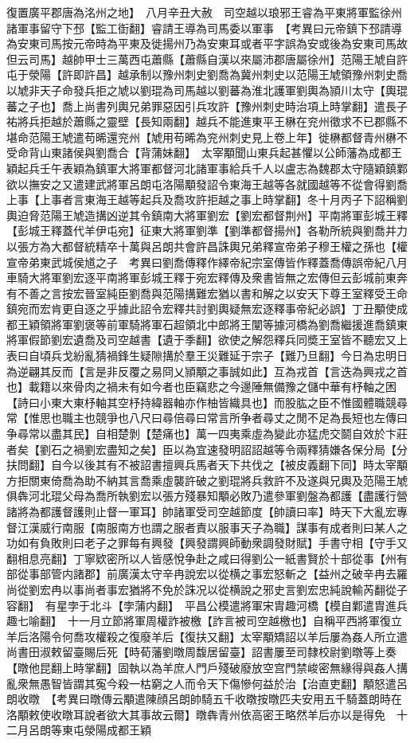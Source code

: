 復置廣平郡唐為洺州之地】　八月辛丑大赦　司空越以琅邪王睿為平東將軍監徐州諸軍事留守下邳【監工衘翻】睿請王導為司馬委以軍事　【考異曰元帝鎮下邳請導為安東司馬按元帝時為平東及徙揚州乃為安東耳或者平字誤為安或後為安東司馬故但云司馬】越帥甲士三萬西屯蕭縣【蕭縣自漢以來屬沛郡唐屬徐州】范陽王虓自許屯于滎陽【許即許昌】越承制以豫州刺史劉喬為冀州刺史以范陽王虓領豫州刺史喬以虓非天子命發兵拒之虓以劉琨為司馬越以劉蕃為淮北護軍劉輿為頴川太守【輿琨蕃之子也】喬上尚書列輿兄弟罪惡因引兵攻許【豫州刺史時治項上時掌翻】遣長子祐將兵拒越於蕭縣之靈壁【長知兩翻】越兵不能進東平王楙在兖州徵求不已郡縣不堪命范陽王虓遣苟晞還兖州【虓用苟晞為兖州刺史見上卷上年】徙楙都督青州楙不受命背山東諸侯與劉喬合【背蒲妹翻】　太宰顒聞山東兵起甚懼以公師藩為成都王穎起兵壬午表穎為鎮軍大將軍都督河北諸軍事給兵千人以盧志為魏郡太守隨穎鎮鄴欲以撫安之又遣建武將軍呂朗屯洛陽顒發詔令東海王越等各就國越等不從會得劉喬上事【上事者言東海王越等起兵及喬攻許拒越之事上時掌翻】冬十月丙子下詔稱劉輿迫脅范陽王虓造搆凶逆其令鎮南大將軍劉宏【劉宏都督荆州】平南將軍彭城王釋【彭城王釋蓋代羊伊屯宛】征東大將軍劉準【劉準都督揚州】各勒所統與劉喬并力以張方為大都督統精卒十萬與呂朗共會許昌誅輿兄弟釋宣帝弟子穆王權之孫也【權宣帝弟東武城侯馗之子　考異曰劉喬傳釋作繹帝紀宗室傳皆作釋蓋喬傳誤帝紀八月車騎大將軍劉宏逐平南將軍彭城王釋于宛宏釋傳及衆書皆無之宏傳但云彭城前東奔有不善之言按宏晉室純臣劉喬與范陽搆難宏猶以書和解之以安天下尊王室釋受王命鎮宛而宏肯更自逐之乎據此詔令宏釋共討劉輿疑無宏逐釋事帝紀必誤】丁丑顒使成都王穎領將軍劉褒等前軍騎將軍石超領北中郎將王闡等據河橋為劉喬繼援進喬鎮東將軍假節劉宏遺喬及司空越書【遺于季翻】欲使之解怨釋兵同奬王室皆不聽宏又上表曰自頃兵戈紛亂猜禍鋒生疑隙搆於羣王災難延于宗子【難乃旦翻】今日為忠明日為逆翩其反而【言是非反覆之易冏乂頴顒之事誠如此】互為戎首【言迭為興戎之首也】載籍以來骨肉之禍未有如今者也臣竊悲之今邊陲無備豫之儲中華有杼軸之困【詩曰小東大東杼軸其空杼持緯器軸亦作柚皆織具也】而股肱之臣不惟國體職競尋常【惟思也職主也競爭也八尺曰尋倍尋曰常言所争者尋丈之閒不足為長短也左傳曰争尋常以盡其民】自相楚剝【楚痛也】萬一四夷乘虛為變此亦猛虎交鬬自效於卞莊者矣【劉石之禍劉宏盡知之矣】臣以為宜速發明詔詔越等令兩釋猜嫌各保分局【分扶問翻】自今以後其有不被詔書擅興兵馬者天下共伐之【被皮義翻下同】時太宰顒方拒關東倚喬為助不納其言喬乘虛襲許破之劉琨將兵救許不及遂與兄輿及范陽王虓俱犇河北琨父母為喬所執劉宏以張方殘暴知顒必敗乃遣參軍劉盤為都護【盡護行營諸將為都護督護則止督一軍耳】帥諸軍受司空越節度【帥讀曰率】時天下大亂宏專督江漢威行南服【南服南方也謂之服者責以服事天子為職】謀事有成者則曰某人之功如有負敗則曰老子之罪每有興發【興發謂興師動衆調發財賦】手書守相【守手又翻相息亮翻】丁寧欵密所以人皆感悅争赴之咸曰得劉公一紙書賢於十部從事【州有部從事部管内諸郡】前廣漢太守辛冉說宏以從横之事宏怒斬之【益州之破辛冉去羅尚從劉宏冉以事尚者事宏猶將不免於誅况以從横說之邪史言劉宏忠純說輸芮翻從子容翻】　有星孛于北斗【孛蒲内翻】　平昌公模遣將軍宋胄趣河橋【模自鄴遣胄進兵趣七喻翻】　十一月立節將軍周權詐被檄【詐言被司空越檄也】自稱平西將軍復立羊后洛陽令何喬攻權殺之復廢羊后【復扶又翻】太宰顒矯詔以羊后屢為姦人所立遣尚書田淑敕留臺賜后死【時荀藩劉暾周馥居留臺】詔書屢至司隸校尉劉暾等上奏【暾他昆翻上時掌翻】固執以為羊庶人門戶殘破廢放空宫門禁峻密無緣得與姦人搆亂衆無愚智皆謂其寃今殺一枯窮之人而令天下傷慘何益於治【治直吏翻】顒怒遣呂朗收暾　【考異曰暾傳云顒遣陳顔呂朗帥騎五千收暾按暾匹夫安用五千騎蓋朗時在洛顒敕使收暾耳說者欲大其事故云爾】暾犇青州依高密王略然羊后亦以是得免　十二月呂朗等東屯滎陽成都王穎